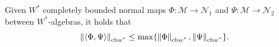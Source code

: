




\begin{proposition} \label{prop:product_cb}
    Given $W^*$ completely bounded normal maps  $\Phi: \mathscr{M} \to \mathscr{N}_1$ and $\Psi: \mathscr{M} \to \mathscr{N}_2$ between $W^*$-algebras, it holds that
  \[
  \left\lVert \langle \Phi, \Psi \rangle \right\rVert_{\text{cb$w^*$}} \leq \max \{\left\lVert \Phi \right\rVert_{\text{cb$w^*$}}, \left\lVert \Psi \right\rVert_{\text{cb$w^*$}}\}.
\]
\end{proposition}



